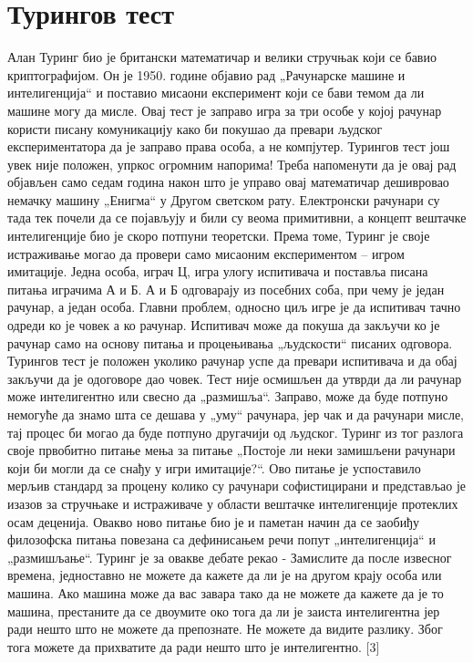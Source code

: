 \section*{Турингов тест}
Алан Туринг био је британски математичар и велики стручњак који се бавио криптографијом. Он је 1950. године објавио рад „Рачунарске машине и интелигенција“ и поставио мисаони експеримент који се бави темом да ли машине могу да мисле. Овај тест је заправо игра за три особе у којој рачунар користи писану комуникацију како би покушао да превари људског експериментатора да је заправо права особа, а не компјутер. Турингов тест још увек није положен, упркос огромним напорима!
Треба напоменути да је овај рад објављен само седам година након што је управо овај математичар дешивровао немачку машину „Енигма“ у Другом светском рату. Електронски рачунари су тада тек почели да се појављују и били су веома примитивни, а концепт вештачке интелигенције био је скоро потпуни теоретски.
Према томе, Туринг је своје истраживање могао да провери само мисаоним експериментом – игром имитације. Једна особа, играч Ц, игра улогу испитивача и поставља писана питања играчима А и Б. А и Б одговарају из посебних соба, при чему је један рачунар, а један особа. Главни проблем, односно циљ игре је да испитивач тачно одреди ко је човек а ко рачунар. Испитивач може да покуша да закључи ко је рачунар само на основу питања и процењивања „људскости“ писаних одговора. Турингов тест је положен уколико рачунар успе да превари испитивача и да обај закључи да је одоговоре дао човек.
Тест није осмишљен да утврди да ли рачунар може интелигентно или свесно да „размишља“. Заправо, може да буде потпуно немогуће да знамо шта се дешава у „уму“ рачунара, јер чак и да рачунари мисле, тај процес би могао да буде потпуно другачији од људског. Туринг из тог разлога своје првобитно питање мења за питање „Постоје ли неки замишљени рачунари који би могли да се снађу у игри имитације?“. Ово питање је успоставило мерљив стандард за процену колико су рачунари софистицирани и представљао је изазов за стручњаке и истраживаче у области вештачке интелигенције протеклих осам деценија. 
Овакво ново питање био је и паметан начин да се заобиђу филозофска питања повезана са дефинисањем речи попут „интелигенција“ и „размишљање“. Туринг је за овакве дебате рекао - Замислите да после извесног времена, једноставно не можете да кажете да ли је на другом крају особа или машина. Ако машина може да вас завара тако да не можете да кажете да је то машина, престаните да се двоумите око тога да ли је заиста интелигентна јер ради нешто што не можете да препознате. Не можете да видите разлику. Због тога можете да прихватите да ради нешто што је интелигентно. [3]